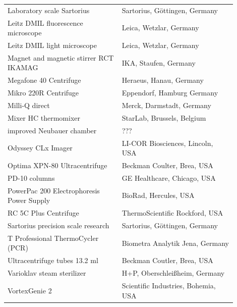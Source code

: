 \begin{longtable}{L{0.45\linewidth} R{0.45\linewidth}}
Laboratory scale Sartorius                & Sartorius, Göttingen, Germany         \\
Leitz DMIL fluorescence microscope        & Leica, Wetzlar, Germany               \\
Leitz DMIL light microscope               & Leica, Wetzlar, Germany              \\
Magnet and magnetic stirrer RCT IKAMAG    & IKA, Staufen, Germany                 \\
Megafone 40 Centrifuge                    & Heraeus, Hanau, Germany               \\
Mikro 220R Centrifuge                     & Eppendorf, Hamburg Germany            \\
Milli-Q direct                            & Merck, Darmstadt, Germany            \\
Mixer HC thermomixer                      & StarLab, Brussels, Belgium           \\
improved Neubauer chamber & ??? \\
Odyssey CLx Imager & LI-COR Biosciences, Lincoln, USA\\
Optima XPN-80 Ultracentrifuge             & Beckman Coulter, Brea, USA           \\
PD-10 columns                             & GE Healthcare, Chicago, USA           \\
PowerPac 200 Electrophoresis Power Supply & BioRad, Hercules, USA                 \\
RC 5C Plus Centrifuge                     & ThermoScientific Rockford, USA       \\
Sartorius precision scale research        & Sartorius, Göttingen, Germany        \\
T Professional ThermoCycler (PCR)         & Biometra Analytik Jena, Germany      \\
Ultracentrifuge tubes 13.2 ml             & Beckman Coutler, Brea, USA           \\
Varioklav steam sterilizer                & H+P, Oberschleißheim, Germany        \\
VortexGenie 2                             & Scientific Industries, Bohemia, USA \\


\end{longtable}

